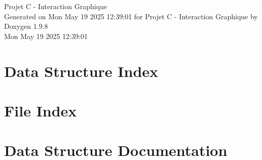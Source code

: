 \documentclass[twoside]{book}
\newcommand{\+}{\discretionary{\mbox{\scriptsize$\hookleftarrow$}}{}{}}
\newcommand{\clearemptydoublepage}{%
    \newpage{\pagestyle{empty}\cleardoublepage}%
  }
\begin{document}
  \raggedbottom
    \hypersetup{pageanchor=false,
                bookmarksnumbered=true,
                pdfencoding=unicode
               }
  \begin{titlepage}
  \vspace*{7cm}
  \begin{center}%
  {\Large Projet C -\/ Interaction Graphique}\\
  \vspace*{1cm}
  {\large Generated on Mon May 19 2025 12\+:39\+:01 for Projet C -\/ Interaction Graphique by Doxygen 1.9.8}\\
    \vspace*{0.5cm}
    {\small Mon May 19 2025 12:39:01}
  \end{center}
  \end{titlepage}
  \clearemptydoublepage
  \tableofcontents
  \clearemptydoublepage
  \hypersetup{pageanchor=true}
\chapter{Data Structure Index}

\chapter{File Index}

\chapter{Data Structure Documentation}















\end{document}
